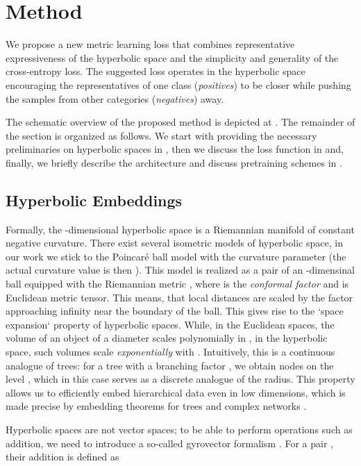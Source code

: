 \documentclass[10pt,twocolumn,letterpaper]{article}
\begin{document}
\section{Method}

\label{sec:method}
We propose a new metric learning loss that combines representative expressiveness of the hyperbolic space and the simplicity and generality of the cross-entropy loss. The suggested loss operates in the hyperbolic space encouraging the representatives of one class ({\em positives}) to be closer while pushing the samples from other categories ({\em negatives}) away. 


The schematic overview of the proposed method is depicted at . The remainder of the section is organized as follows. We start with providing the necessary preliminaries on hyperbolic spaces in , then we discuss the loss function in  and, finally, we briefly describe the architecture and discuss pretraining schemes in .


\subsection{Hyperbolic Embeddings}
\label{sec:hyperb}
Formally, the -dimensional hyperbolic space  is a Riemannian manifold of constant negative curvature. There exist several isometric models of hyperbolic space, in our work we stick to the Poincar\'e ball model  with the curvature parameter  (the actual curvature value is then ). This model is realized as a pair of an -dimensinal ball  equipped with the Riemannian metric , where  is the \emph{conformal factor} and  is Euclidean metric tensor. This means, that local distances are scaled by the factor  approaching infinity near the boundary of the ball. This gives rise to the `space expansion` property of hyperbolic spaces. While, in the Euclidean spaces, the volume of an object of a diameter  scales polynomially in , in the hyperbolic space, such volumes scale \emph{exponentially} with . Intuitively, this is a continuous analogue of trees: for a tree with a branching factor , we obtain  nodes on the level , which in this case serves as a discrete analogue of the radius. This property allows us to efficiently embed hierarchical data even in low dimensions, which is made precise by embedding theorems for trees and complex networks \cite{sarkar2011low}.

Hyperbolic spaces are not vector spaces; to be able to perform operations such as addition, we need to introduce a so-called gyrovector formalism \cite{ungar2008gyrovector}. For a pair , their addition is defined as
\end{document}
